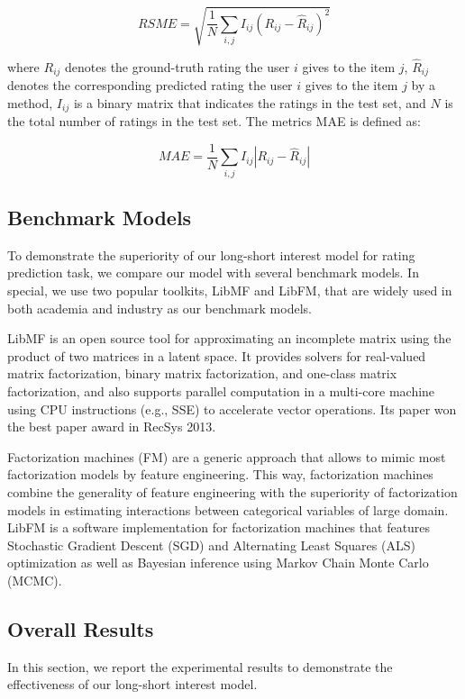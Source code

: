 \documentclass{sig-alternate-05-2015}
\begin{document}
\begin{equation}
    RSME = \sqrt{ \frac{1}{N} \sum_{i,j} I_{ij} (R_{ij} - \hat{R}_{ij})^2 }
\end{equation}

where $R_{ij}$ denotes the ground-truth rating the user $i$ gives to the item $j$,
$\hat{R}_{ij}$ denotes the corresponding predicted rating the user $i$ gives to
the item $j$ by a method, $I_{ij}$ is a binary matrix that indicates the ratings
in the test set, and $N$ is the total number of ratings in the test set.
The metrics MAE is defined as:

\begin{equation}
    MAE = \frac{1}{N} \sum_{i,j} I_{ij} |R_{ij} - \hat{R}_{ij}|
\end{equation}

\subsection{Benchmark Models}
To demonstrate the superiority of our long-short interest model for rating prediction task,
we compare our model with several benchmark models.
In special, we use two popular toolkits, LibMF and LibFM, that are
widely used in both academia and industry as our benchmark models.

LibMF is an open source tool for approximating an incomplete matrix
using the product of two matrices in a latent space.
It provides solvers for real-valued matrix factorization,
binary matrix factorization, and one-class matrix factorization, and 
also supports parallel computation in a multi-core machine using CPU
instructions (e.g., SSE) to accelerate vector operations.
Its paper \cite{chin2015fast} won the best paper award in RecSys 2013.

Factorization machines (FM) are a generic approach that
allows to mimic most factorization models by feature engineering.
This way, factorization machines combine the generality of
feature engineering with the superiority of factorization models
in estimating interactions between categorical variables of large domain.
LibFM \cite{rendle2012factorization} is a software implementation
for factorization machines that features
Stochastic Gradient Descent (SGD) and
Alternating Least Squares (ALS) optimization as well as
Bayesian inference using Markov Chain Monte Carlo (MCMC).

\subsection{Overall Results}
In this section, we report the experimental results to demonstrate
the effectiveness of our long-short interest model.
\end{document}
